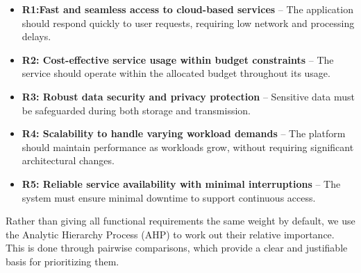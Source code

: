 \documentclass[twocolumn]{svjour3}
\begin{document}
\begin{itemize}
    \item \textbf{R1:Fast and seamless access to cloud-based services} – The application should respond quickly to user requests, requiring low network and processing delays.
   \item \textbf{R2: Cost-effective service usage within budget constraints} – The service should operate within the allocated budget throughout its usage.
\item \textbf{R3: Robust data security and privacy protection} – Sensitive data must be safeguarded during both storage and transmission.
\item \textbf{R4: Scalability to handle varying workload demands} – The platform should maintain performance as workloads grow, without requiring significant architectural changes.
 \item \textbf{R5: Reliable service availability with minimal interruptions} – The system must ensure minimal downtime to support continuous access.

\end{itemize}

Rather than giving all functional requirements the same weight by default, we use the Analytic Hierarchy Process (AHP) to work out their relative importance. This is done through pairwise comparisons, which provide a clear and justifiable basis for prioritizing them.
\end{document}
